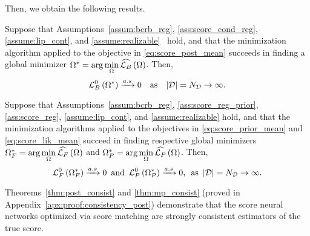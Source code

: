 
Then, {we obtain the following results.  }

\begin{theorem} \label{thm:post_consist}
    Suppose that Assumptions~\ref{assum:bcrb_reg}, \ref{ass:score_cond_reg}, {\ref{assume:lip_cont},} and {\ref{assume:realizable}}~ hold, {and that the minimization algorithm applied to the objective in \eqref{eq:score_post_mean} succeeds in finding a global minimizer $\Omega^*={\arg\min\limits_{\Omega}\widehat{\mathcal{L}_{B}}\left(\Omega\right)}$.
    }  Then,
    \begin{equation*}
        {\mathcal{L}_{B}^{0}}\left(\Omega^{*}\right)\xrightarrow{a.s} 0\quad\text{as} \quad\abs{\mathcal{D}}=N_{\mathcal{D}}\rightarrow \infty.
    \end{equation*}
\end{theorem}

\begin{theorem}\label{thm:mp_consist}
    Suppose that Assumptions~\ref{assum:bcrb_reg}, \ref{ass:score_reg_prior}, \ref{ass:score_reg}, {\ref{assume:lip_cont},} {and \ref{assume:realizable}} hold, 
    {and that the minimization algorithms applied to the objectives in \eqref{eq:score_prior_mean} and \eqref{eq:score_lik_mean} succeed in finding respective global minimizers {$\Omega_{F}^{*}=\arg\min\limits_{\Omega}\widehat{\mathcal{L}_{F}}\left(\Omega\right)$ and $\Omega_{P}^{*}=\arg\min\limits_{\Omega}\widehat{\mathcal{L}_{P}}\left(\Omega\right)$.}
    }
    Then,
        \begin{equation*}
        {\mathcal{L}_{F}^{0}}\left(\Omega_{F}^{*}\right)\xrightarrow{a.s} 0\mkern9mu \text{and}\mkern9mu{\mathcal{L}_{P}^{0}}\left(\Omega_{P}^{*}\right)\xrightarrow{a.s} 0, \mkern9mu\text{as} \mkern9mu \abs{\mathcal{D}}=N_{\mathcal{D}}\rightarrow \infty. 
    \end{equation*}
\end{theorem}


Theorems~\ref{thm:post_consist} and \ref{thm:mp_consist} (proved in Appendix~\ref{apx:proof:consistency_post}) demonstrate that {the score neural networks optimized via score matching are strongly consistent estimators of the true score. }



